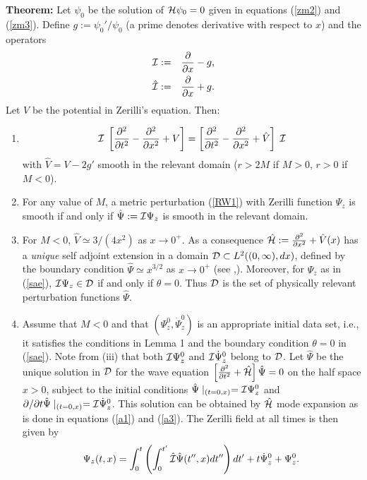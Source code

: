\documentclass[aps,floats,showpacs,amssymb,tightenlines]{revtex4}
\def\p{\partial}
\def\I{{\cal I}}
\begin{document}
\noindent
{\bf Theorem:} Let $\psi_0$ be the solution of  ${\cal H} \psi_0 =0$ given  in equations (\ref{zm2}) and (\ref{zm3}).
 Define $g:=\psi_0{}'/\psi_0$
(a prime denotes derivative with respect to $x$) and the operators
\begin{eqnarray}\label{hp2}
\I  &:=& \frac{\p}{\p x} - g , \\
\hat \I  &:=& \frac{\p}{\p x} + g .
\end{eqnarray}
Let $V$ be the potential in Zerilli's equation. Then:
\renewcommand{\labelenumi}{(\roman{enumi})}
\begin{enumerate}
\item $$\I \; \left[ \frac{\p^2 }{\p t^2} - \frac{\p^2 }{\p x^2} + V \right]  =   \left[ \frac{\p^2 }{\p t^2} - \frac{\p^2 }{\p x^2}
+ \hat V \right] \; \I$$
with $\hat V = V - 2 g'$
smooth in the relevant domain ($r>2M$ if $M>0$, $r>0$ if $M<0$).
\item For any value of $M$, a  metric perturbation (\ref{RW1}) with Zerilli function $\Psi_z$
is smooth if and only if $\hat \Psi := \I \Psi_z$ is smooth in the relevant domain.
\item For $M<0$,
$\hat V \simeq 3/(4x^2)$ as $x \to 0^+$. As a consequence
 $\hat {\cal H}:=  \frac{\p^2 }{\p x^2} + \hat V(x)$
has a {\em unique} self adjoint extension in a domain ${\cal D} \subset L^2((0,\infty),dx)$, defined by the boundary condition
$\hat \Psi \simeq x^{3/2}$ as $x \to 0^+$ (see \cite{meetz},\cite{reed}).
 Moreover, for $\Psi_z$ as in (\ref{sae}), $\I \Psi_z \in {\cal D}$ if and
only if $\theta=0$. Thus ${\cal D}$ is the set of  physically relevant perturbation functions $\hat \Psi$.
\item Assume that $M<0$ and  that $(\Psi_z^0, \dot \Psi_z^0)$ is an appropriate initial data set, i.e., it satisfies
 the conditions in Lemma 1 and
the boundary condition $\theta=0$ in (\ref{sae}). Note from (iii) that both $\I \Psi_z^0$ and $\I \dot \Psi_z^0$ belong to
${\cal D}$.  Let
 $\hat \Psi$ be the unique solution in ${\cal D}$
for the wave equation $\left[ \frac{\p^2 }{\p t^2} + \hat {\cal H} \right] \hat \Psi =0$ on the half space $x>0$,
subject to the initial conditions $\hat \Psi \mid_{(t=0,x)}= \I \Psi_z^0$ and $\p/\p t \hat \Psi
\mid_{(t=0,x)} = \I \dot \Psi_z^0$.
This solution can be obtained by $\hat {\cal H}$ mode expansion as is done in   equations (\ref{a1}) and (\ref{a3}).
 The Zerilli field at all times is then given by
\begin{equation}  \label{conv}
\Psi_z(t,x) = \int_0^t \left( \int_0^{t'} \hat \I \hat \Psi(t'',x) dt'' \right) dt' + t \dot \Psi_z^0 + \Psi_z^0.
\end{equation}
\end{enumerate}
\end{document}
